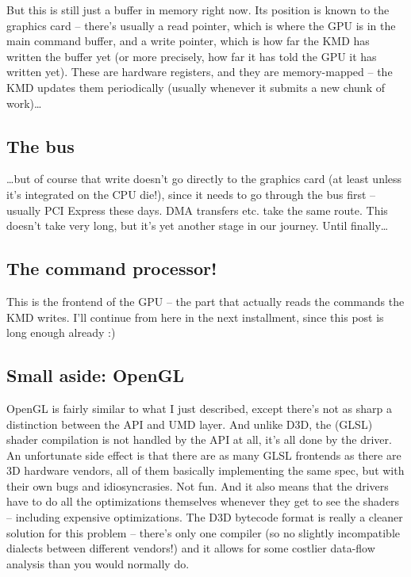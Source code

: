 \documentclass[12pt]{article}
\begin{document}
But this is still just a buffer in memory right now.
Its position is known to the graphics card – there’s usually a read pointer, which is where the GPU is in the main command buffer, and a write pointer, which is how far the KMD has written the buffer yet (or more precisely, how far it has told the GPU it has written yet).
These are hardware registers, and they are memory-mapped – the KMD updates them periodically (usually whenever it submits a new chunk of work)…

\subsection{The bus}
\label{sec:org88e1e93}
…but of course that write doesn’t go directly to the graphics card (at least unless it’s integrated on the CPU die!), since it needs to go through the bus first – usually PCI Express these days.
DMA transfers etc.
take the same route.
This doesn’t take very long, but it’s yet another stage in our journey.
Until finally…

\subsection{The command processor!}
\label{sec:org6c3eee6}
This is the frontend of the GPU – the part that actually reads the commands the KMD writes.
I’ll continue from here in the next installment, since this post is long enough already :)

\subsection{Small aside: OpenGL}
\label{sec:org48c1da3}
OpenGL is fairly similar to what I just described, except there’s not as sharp a distinction between the API and UMD layer.
And unlike D3D, the (GLSL) shader compilation is not handled by the API at all, it’s all done by the driver.
An unfortunate side effect is that there are as many GLSL frontends as there are 3D hardware vendors, all of them basically implementing the same spec, but with their own bugs and idiosyncrasies.
Not fun.
And it also means that the drivers have to do all the optimizations themselves whenever they get to see the shaders – including expensive optimizations.
The D3D bytecode format is really a cleaner solution for this problem – there’s only one compiler (so no slightly incompatible dialects between different vendors!) and it allows for some costlier data-flow analysis than you would normally do.
\end{document}
